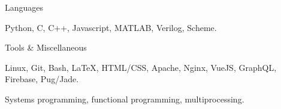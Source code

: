 \begin{cventries}
  \cventry
    {Languages}
    {}
    {}
    {}
    {
      \begin{cvitems}
        \item {Python, C, C++, Javascript, MATLAB, Verilog, Scheme.}
      \end{cvitems}
    }
  \cventry
    {Tools \& Miscellaneous }
    {}
    {}
    {}
    {
      \begin{cvitems}
        \item {Linux, Git, Bash, \LaTeX, HTML/CSS, Apache, Nginx, VueJS, GraphQL, Firebase, Pug/Jade.}
        \item {Systems programming, functional programming, multiprocessing.}
      \end{cvitems}
    }
\end{cventries}
